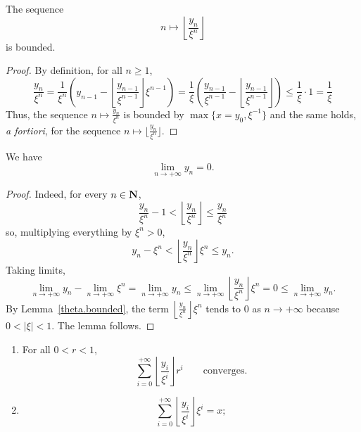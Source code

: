 \begin{lemma}
  \label{theta.bounded}
	The sequence
	\[
		n \mapsto \left\lfloor \frac{y_n}{\xi^n} \right\rfloor
	\]
	is bounded.
\end{lemma}

\begin{proof}
	By definition, for all $n\geq 1$,
	\[
		\frac{y_n}{\xi^n} = \frac{1}{\xi^n} \left(y_{n-1} - \left\lfloor \frac{y_{n-1}}{\xi^{n-1}} \right\rfloor \xi^{n-1}\right)
    = \frac{1}{\xi} \left(\frac{y_{n-1}}{\xi^{n-1}} - \left\lfloor \frac{y_{n-1}}{\xi^{n-1}} \right\rfloor\right)
    \le \frac{1}{\xi}\cdot 1
    = \frac{1}{\xi}
  \]
  Thus, the sequence $n\mapsto \frac{y_n}{\xi^n}$ is bounded by $\max\{x=y_0,\xi^{-1}\}$
  and the same holds, \emph{a fortiori}, for the sequence $n\mapsto \lfloor\frac{y_n}{\xi^n}\rfloor$. 
\end{proof}

\begin{lemma}
  \label{theta.limit_y}
  \leanok
  We have
  \[
    \lim_{n\to+\infty} y_n =0.
  \]
\end{lemma}

\begin{proof}
  \leanok
  Indeed, for every $n\in \mathbf{N}$,
  \[
    \frac{y_n}{\xi^n} - 1 <\left\lfloor{\frac{y_n}{\xi^n}}\right\rfloor \le \frac{y_n}{\xi^n}
  \]
  so, multiplying everything by $\xi^n > 0$,
  \[
    y_n - \xi^n <\left\lfloor{\frac{y_n}{\xi^n}}\right\rfloor\xi^n \le y_n.
  \]
  Taking limits,
  \[
    \lim_{n\to+\infty} y_n - \lim_{n\to+\infty} \xi^n
    = \lim_{n\to+\infty} y_n
    \le \lim_{n\to+\infty} \left\lfloor \frac{y_n}{\xi^n} \right\rfloor \xi^n
    = 0\le\lim_{n\to+\infty} y_n.
  \]
  By Lemma~\ref{theta.bounded},
  the term $\left\lfloor\frac{y_n}{\xi^n}\right\rfloor\xi^n$
  tends to $0$ as $n\to +\infty$ because $0<\lvert \xi\rvert< 1$.
  The lemma follows.
\end{proof}

\begin{proposition}
  \label{theta.has_sum_x}
  \leanok
  \begin{enumerate}
    \item For all $0<r <1$,
      \[
        \sum_{i=0}^{+\infty} \left\lfloor\frac{y_i}{\xi^i}\right\rfloor r^i \qquad\text{converges}.
      \]
    \item
      \[
        \sum_{i=0}^{+\infty} \left\lfloor\frac{y_i}{\xi^i}\right\rfloor\xi^i = x;
      \]
  \end{enumerate}
\end{proposition}

